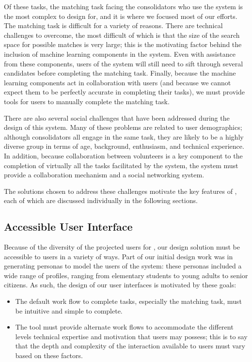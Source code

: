 Of these tasks, the matching task facing the consolidators who use the system is the most complex to design for, and it is where we focused most of our efforts.  The matching task is difficult for a variety of reasons.  There are technical challenges to overcome, the most difficult of which is that the size of the search space for possible matches is very large; this is the motivating factor behind the inclusion of machine learning components in the system.  Even with assistance from these components, users of the system will still need to sift through several candidates before completing the matching task.  Finally, because the machine learning components act in collaboration with users (and because we cannot expect them to be perfectly accurate in completing their tasks), we must provide tools for users to manually complete the matching task. 

There are also several social challenges that have been addressed during the design of this system.  Many of these problems are related to user demographics; although consolidators all engage in the same task, they are likely to be a highly diverse group in terms of age, background, enthusiasm, and technical experience.  In addition, because collaboration between volunteers is a key component to the completion of virtually all the tasks facilitated by the system, the system must provide a collaboration mechanism and a social networking system.  

The solutions chosen to address these challenges motivate the key features of \nplh, each of which are discussed individually in the following sections.

\subsection {Accessible User Interface}

Because of the diversity of the projected users for \nplh, our design solution must be accessible to users in a variety of ways.  Part of our initial design work was in generating personas to model the users of the system: these personas included a wide range of profiles, ranging from elementary students to young adults to senior citizens\cite{sdc}.  As such, the design of our user interfaces is motivated by these goals:

\begin{itemize}
  \item{} The default work flow to complete tasks, especially the matching task, must be intuitive and simple to complete.
  \item{} The tool must provide alternate work flows to accommodate the different levels technical expertise and motivation that users may possess; this is to say that the depth and complexity of the interaction available to users must vary based on these factors.
\end{itemize}

